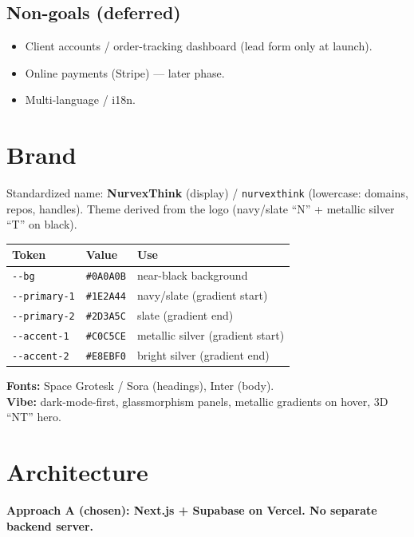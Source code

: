 \documentclass[11pt,a4paper]{article}
\begin{document}
\subsection{Non-goals (deferred)}
\begin{itemize}
  \item Client accounts / order-tracking dashboard (lead form only at launch).
  \item Online payments (Stripe) --- later phase.
  \item Multi-language / i18n.
\end{itemize}

\section{Brand}
Standardized name: \textbf{NurvexThink} (display) / \texttt{nurvexthink} (lowercase: domains,
repos, handles). Theme derived from the logo (navy/slate ``N'' + metallic silver ``T'' on black).

\begin{center}
\begin{tabularx}{\textwidth}{l l Y}
\toprule
\textbf{Token} & \textbf{Value} & \textbf{Use}\\
\midrule
\texttt{-{}-bg} & \texttt{\#0A0A0B} & near-black background\\
\texttt{-{}-primary-1} & \texttt{\#1E2A44} & navy/slate (gradient start)\\
\texttt{-{}-primary-2} & \texttt{\#2D3A5C} & slate (gradient end)\\
\texttt{-{}-accent-1} & \texttt{\#C0C5CE} & metallic silver (gradient start)\\
\texttt{-{}-accent-2} & \texttt{\#E8EBF0} & bright silver (gradient end)\\
\bottomrule
\end{tabularx}
\end{center}

\textbf{Fonts:} Space Grotesk / Sora (headings), Inter (body).\\
\textbf{Vibe:} dark-mode-first, glassmorphism panels, metallic gradients on hover, 3D ``NT'' hero.

\section{Architecture}
\textbf{Approach A (chosen): Next.js + Supabase on Vercel. No separate backend server.}
\end{document}
